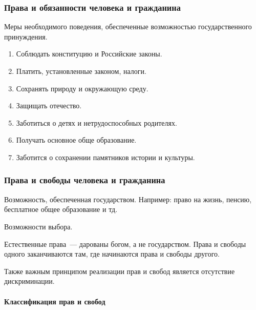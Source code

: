 \documentclass[12pt]{article}
\begin{document}
	\subsubsection{Права и обязанности человека и гражданина}
	
	\begin{definition}[Обязанности]
		Меры необходимого поведения, обеспеченные возможностью государственного принуждения.
	\end{definition}
	
	\begin{enumerate}
		\item Соблюдать конституцию и Российские законы.
		\item Платить, установленные законом, налоги.
		\item Сохранять природу и окружающую среду.
		\item Защищать отечество.
		\item Заботиться о детях и нетрудоспособных родителях.
		\item Получать основное обще образование.
		\item Заботится о сохранении памятников истории и культуры.
	\end{enumerate}
	
	\subsubsection{Права и свободы человека и гражданина}
	
	\begin{definition}[Права]
		Возможность, обеспеченная государством. Например: право на жизнь, пенсию, бесплатное общее образование и тд.
	\end{definition}
	
	\begin{definition}[Свободы]
		Возможности выбора.
	\end{definition}
	
	\begin{person}
		Естественные права~--- дарованы богом, а не государством. Права и свободы одного заканчиваются там, где начинаются права и свободы другого.
	\end{person}
	
	\begin{note}
		Также важным принципом реализации прав и свобод является отсутствие дискриминации.
	\end{note}
	
	\paragraph{Классификация прав и свобод}
	
\end{document}

